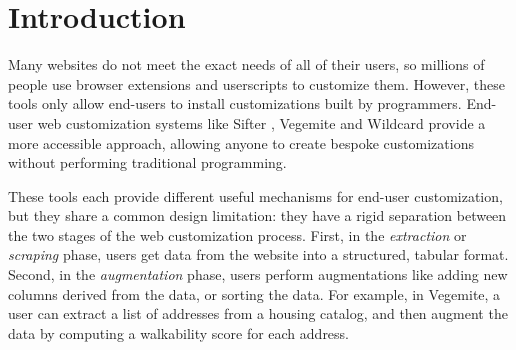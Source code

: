 \documentclass[sigconf,10pt]{acmart}
\begin{document}


\maketitle

\hypertarget{sec:introduction}{%
\section{Introduction}\label{sec:introduction}}

Many websites do not meet the exact needs of all of their users, so
millions of people use browser extensions and userscripts
\citep{zotero-224, 2021f} to customize them. However, these tools only
allow end-users to install customizations built by programmers. End-user
web customization systems like Sifter \citep{huynh2006}, Vegemite
\citep{lin2009} and Wildcard \citep{litt2020} provide a more accessible
approach, allowing anyone to create bespoke customizations without
performing traditional programming.

These tools each provide different useful mechanisms for end-user
customization, but they share a common design limitation: they have a
rigid separation between the two stages of the web customization
process. First, in the \emph{extraction} or \emph{scraping} phase, users
get data from the website into a structured, tabular format. Second, in
the \emph{augmentation} phase, users perform augmentations like adding
new columns derived from the data, or sorting the data. For example, in
Vegemite, a user can extract a list of addresses from a housing catalog,
and then augment the data by computing a walkability score for each
address.
\end{document}
